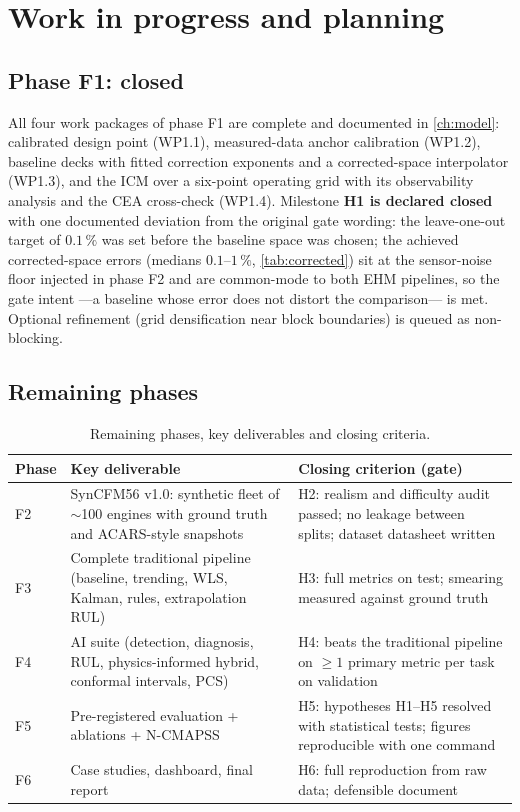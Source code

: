 \chapter{Work in progress and planning}
\label{ch:wip}

\section{Phase F1: closed}

All four work packages of phase F1 are complete and documented in \cref{ch:model}: calibrated
design point (WP1.1), measured-data anchor calibration (WP1.2), baseline decks with fitted
correction exponents and a corrected-space interpolator (WP1.3), and the ICM over a six-point
operating grid with its observability analysis and the CEA cross-check (WP1.4). Milestone
\textbf{H1 is declared closed} with one documented deviation from the original gate wording:
the leave-one-out target of $0.1\,\%$ was set before the baseline space was chosen; the
achieved corrected-space errors (medians $0.1$--$1\,\%$, \cref{tab:corrected}) sit at the
sensor-noise floor injected in phase F2 and are common-mode to both EHM pipelines, so the gate
intent ---a baseline whose error does not distort the comparison--- is met. Optional
refinement (grid densification near block boundaries) is queued as non-blocking.

\section{Remaining phases}

\begin{table}[htbp]
  \centering\small
  \caption{Remaining phases, key deliverables and closing criteria.}
  \label{tab:remaining-phases}
  \begin{tabular}{p{}p{}p{}}
    \toprule
    Phase & Key deliverable & Closing criterion (gate) \\
    \midrule
    F2 & SynCFM56 v1.0: synthetic fleet of $\sim$100 engines with ground truth and ACARS-style
         snapshots &
         H2: realism and difficulty audit passed; no leakage between splits; dataset datasheet
         written \\
    F3 & Complete traditional pipeline (baseline, trending, WLS, Kalman, rules, extrapolation
         RUL) &
         H3: full metrics on test; smearing measured against ground truth \\
    F4 & AI suite (detection, diagnosis, RUL, physics-informed hybrid, conformal intervals,
         PCS) &
         H4: beats the traditional pipeline on $\geq1$ primary metric per task on validation \\
    F5 & Pre-registered evaluation + ablations + N-CMAPSS &
         H5: hypotheses H1--H5 resolved with statistical tests; figures reproducible with one
         command \\
    F6 & Case studies, dashboard, final report &
         H6: full reproduction from raw data; defensible document \\
    \bottomrule
  \end{tabular}
\end{table}

